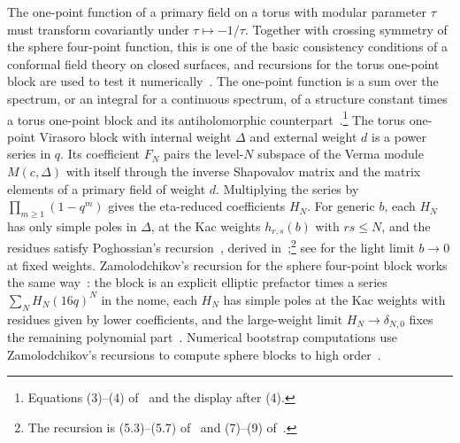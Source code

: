 \documentclass[twoside,10pt]{article}
\numberwithin{equation}{section}
\theoremstyle{slbody}
\theoremstyle{definition}
\theoremstyle{remark}
\begin{document}
The one-point function of a primary field on a torus with modular parameter
\(\tau\) must transform covariantly under \(\tau\mapsto-1/\tau\).  Together
with crossing symmetry of the sphere four-point function, this is one of the
basic consistency conditions of a conformal field theory on closed surfaces,
and recursions for the torus one-point block are used to test it
numerically~\cite[\S\S1 and~5]{HadaszJaskolskiSuchanek2010}.  The one-point
function is a sum over the spectrum, or an integral for a continuous
spectrum, of a structure constant times a torus one-point block and its
antiholomorphic
counterpart~\cite[\S2]{HadaszJaskolskiSuchanek2010}.\footnote{Equations (3)--(4) of~\cite{HadaszJaskolskiSuchanek2010} and the display after (4).}  The torus one-point Virasoro block with internal weight \(\Delta\) and
external weight \(d\) is a power series in \(q\).  Its coefficient \(F_N\)
pairs the level-\(N\) subspace of the Verma module \(M(c,\Delta)\) with itself
through the inverse Shapovalov matrix and the matrix elements of a primary
field of weight \(d\).  Multiplying the series by
\(\prod_{m\geq1}(1-q^m)\) gives the eta-reduced coefficients \(H_N\).  For
generic \(b\), each \(H_N\) has only simple poles
in \(\Delta\), at the Kac weights \(h_{r,s}(b)\) with \(rs\leq N\), and the
residues satisfy Poghossian's recursion~\cite[\S5]{Poghossian2009}, derived
in~\cite[\S3]{HadaszJaskolskiSuchanek2010};\footnote{The recursion is (5.3)--(5.7) of~\cite{Poghossian2009} and (7)--(9) of~\cite{HadaszJaskolskiSuchanek2010}.} see
\cite[\S2.2]{PoghosyanPoghosyan2026} for the light limit \(b\to0\) at fixed
weights.  Zamolodchikov's recursion for the sphere four-point block works the
same way~\cite{Zamolodchikov1987}: the block is an explicit elliptic
prefactor times a series \(\sum_NH_N(16q)^N\) in the nome, each \(H_N\) has
simple poles at the Kac weights with residues given by lower coefficients,
and the large-weight limit \(H_N\to\delta_{N,0}\) fixes the remaining
polynomial part~\cite[Theorem~3.1]{PolzerLargeWeight2026}.  Numerical
bootstrap computations use Zamolodchikov's recursions to compute sphere
blocks to high order~\cite[\S4.3]{Ribault2026}.
\end{document}
